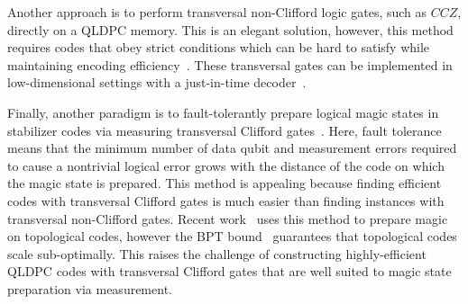 \documentclass[11pt]{article}
\begin{document}
Another approach is to perform transversal non-Clifford logic gates, such as $CCZ$, directly on a QLDPC memory. 
This is an elegant solution, however, this method requires codes that obey strict conditions which can be hard to satisfy while maintaining encoding efficiency~\cite{Zhu_2025, Breuckmann_2026, jacob2026singleshotdecodingfaulttolerantgates,Menon_2026,bauer2026findingdiagonallogicalgates,sahay2026computingqldpccodesclimbing}.
These transversal gates can be implemented in low-dimensional settings with a just-in-time decoder~\cite{bombin2018transversal,brown2020fault, Scruby_2022}.

Finally, another paradigm is to fault-tolerantly prepare logical magic states in stabilizer codes via measuring transversal Clifford gates~\cite{Chamberland_2019, chamberland2020very,brown2020fault,gidney2024magic,gupta2024encoding,hetenyi2026constant,davydova2025universal,sajith2025noncliffordgatesstabilizercodes,williamson2026fast,huang2025generatinglogicalmagicstates,huang2026hybridlatticesurgerynonclifford,zhu2026nonabelianQLDPCtqftformalism,christos2026nonabelianquantumlowdensityparity}.
Here, fault tolerance means that the minimum number of data qubit and measurement errors required to cause a nontrivial logical error grows with the distance of the code on which the magic state is prepared.
This method is appealing because finding efficient codes with transversal Clifford gates is much easier than finding instances with transversal non-Clifford gates.
Recent work~\cite{davydova2025universal, huang2026hybridlatticesurgerynonclifford, huang2025generatinglogicalmagicstates, Kobayashi_2026, warman2026constantdepthcliffordhierarchygatesnonabelian, manjunath2026universalquantumcomputationgroup} uses this method to prepare magic on topological codes, however the BPT bound~\cite{bravyi2010tradeoffs} guarantees that topological codes scale sub-optimally.
This raises the challenge of constructing highly-efficient QLDPC codes with transversal Clifford gates that are well suited to magic state preparation via measurement. 
\end{document}
